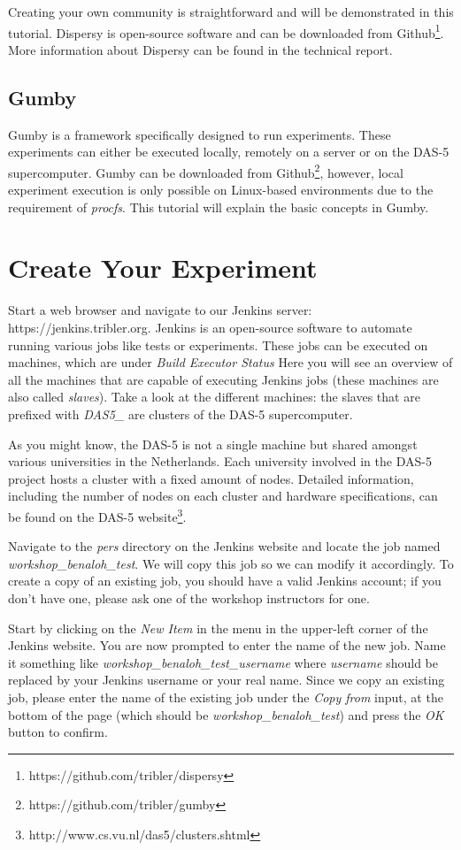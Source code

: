 \documentclass{article}
\begin{document}
Creating your own community is straightforward and will be demonstrated in this tutorial.
Dispersy is open-source software and can be downloaded from Github\footnote{https://github.com/tribler/dispersy}.
More information about Dispersy can be found in the technical report\cite{zeilemaker2013dispersy}.

\subsection{Gumby}
Gumby is a framework specifically designed to run experiments.
These experiments can either be executed locally, remotely on a server or on the DAS-5 supercomputer.
Gumby can be downloaded from Github\footnote{https://github.com/tribler/gumby}, however, local experiment execution is only possible on Linux-based environments due to the requirement of \emph{procfs}.
This tutorial will explain the basic concepts in Gumby.

\section{Create Your Experiment}
\label{sec:create_experiment}
Start a web browser and navigate to our Jenkins server: https://jenkins.tribler.org.
Jenkins is an open-source software to automate running various jobs like tests or experiments.
These jobs can be executed on machines, which are under \emph{Build Executor Status} 
Here you will see an overview of all the machines that are capable of executing Jenkins jobs (these machines are also called \emph{slaves}).
Take a look at the different machines: the slaves that are prefixed with \emph{DAS5\_} are clusters of the DAS-5 supercomputer.

As you might know, the DAS-5 is not a single machine but shared amongst various universities in the Netherlands.
Each university involved in the DAS-5 project hosts a cluster with a fixed amount of nodes.
Detailed information, including the number of nodes on each cluster and hardware specifications, can be found on the DAS-5 website\footnote{http://www.cs.vu.nl/das5/clusters.shtml}.

Navigate to the \emph{pers} directory on the Jenkins website and locate the job named \emph{workshop\_benaloh\_test}.
We will copy this job so we can modify it accordingly.
To create a copy of an existing job, you should have a valid Jenkins account; if you don't have one, please ask one of the workshop instructors for one.

Start by clicking on the \emph{New Item} in the menu in the upper-left corner of the Jenkins website.
You are now prompted to enter the name of the new job.
Name it something like \emph{workshop\_benaloh\_test\_username} where \emph{username} should be replaced by your Jenkins username or your real name.
Since we copy an existing job, please enter the name of the existing job under the \emph{Copy from} input, at the bottom of the page (which should be \emph{workshop\_benaloh\_test}) and press the \emph{OK} button to confirm.
\end{document}

